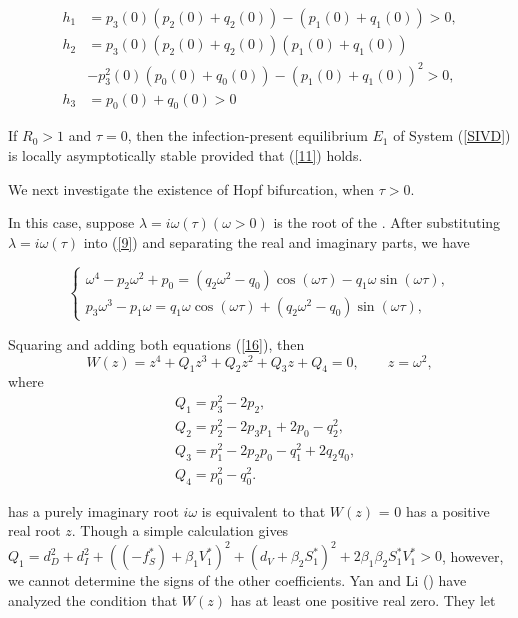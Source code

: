 \documentclass{CMHPhD-SIVD}
\begin{document}
\begin{equation}\label{11}
\begin{aligned}
h_{1}&=p_3(0)(p_2(0) + q_2(0))-(p_1(0) + q_1(0))>0,\\
h_{2}&=p_3(0)(p_2(0) + q_2(0))(p_1(0) + q_1(0))\nonumber \\
&-p_3^2(0)(p_0(0) +q_0(0))-(p_1(0) + q_1(0))^2>0,\\
h_{3}&=p_0(0) +q_0(0)>0
\end{aligned}
\end{equation}

 If $R_0 > 1$ and $\tau = 0$, then the infection-present equilibrium $E_1$ of System (\ref{SIVD}) is locally asymptotically stable provided that (\ref{11}) holds.


We next investigate the existence of Hopf bifurcation, when $\tau>0$.

In this case, suppose $\lambda= i\omega(\tau)(\omega > 0)$ is the root of the . After substituting $\lambda =i\omega(\tau)$ into (\ref{9}) and separating the real and imaginary parts, we have

\begin{equation}\label{16}
\left\{
   \begin{array}{ll}
    \omega^{4}-p_{2}\omega^{2}+p_0=(q_2 \omega^{2}-q_0)\cos(\omega\tau)-q_1 \omega \sin(\omega\tau),\\
    p_3 \omega^{3}-p_1 \omega=q_1 \omega \cos(\omega\tau)+ (q_2 \omega^{2}-q_0)\sin(\omega\tau),
   \end{array}
\right.
\end{equation}

Squaring and adding both equations (\ref{16}), then
\begin{equation}\label{17}
W(z)=z^4+Q_1 z^3+Q_2 z^2+Q_3 z+Q_4=0,  \qquad  z=\omega^2,
\end{equation}
where
\begin{align*}
&Q_1=p_3^2 - 2 p_2,\\
&Q_2=p_2^2 - 2 p_3 p_1 + 2 p_0 - q_2^2,\\
&Q_3=p_1^2 - 2 p_2 p_0 - q_1^2 + 2 q_2 q_0,\\
&Q_4=p_0^2 - q_0^2.
\end{align*}


 has a purely imaginary root $i \omega$ is equivalent to that $W(z)$ = 0 has a
positive real root $z$. Though a simple calculation gives $Q_1=d_D^2+d_I^2+\left(\left(-f_S^*\right)+\beta_1 V_1^*\right)^2+(d_V+\beta_2 S_1^*)^2+2 \beta_1 \beta_2 S_1^* V_1^* >0$, however, we cannot determine the signs of the other coefficients. Yan and Li (\cite{yan2006stability}) have analyzed the condition that $W(z)$ has at least one positive real zero. They let
\end{document}
